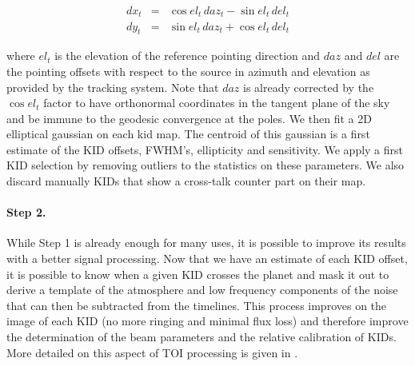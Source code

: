 \begin{eqnarray}
dx_t &=& \cos el_t\, daz_t - \sin el_t\, del_t \nonumber \\
dy_t &=& \sin el_t\, daz_t + \cos el_t\, del_t \nonumber
\end{eqnarray}


where $el_t$ is the elevation of the reference pointing direction and $daz$ and
$del$ are the pointing offsets with respect to the source in azimuth and elevation as
provided by the tracking system. Note that $daz$ is already corrected by the
$\cos el_t$ factor to have orthonormal coordinates in the tangent plane of the sky
and be immune to the geodesic convergence at the poles. We then fit a 2D
elliptical gaussian on each kid map. The centroid of this gaussian is a first
estimate of the KID offsets, FWHM's, ellipticity and sensitivity. We apply a
first KID selection by removing outliers to the statistics on these
parameters. We also discard manually KIDs that show a cross-talk counter part on
their map. 

\paragraph{Step 2.} While Step 1 is already enough for many uses, it is possible
to improve its results with a better signal processing. Now that we have an
estimate of each KID offset, it is possible to know when a given KID crosses the
planet and mask it out to derive a template of the atmosphere and low frequency
components of the noise that can then be subtracted from the timelines. This
process improves on the image of each KID (no more ringing and minimal flux
loss) and therefore improve the determination of the beam parameters and the
relative calibration of KIDs. More detailed on this aspect of TOI processing is
given in .

